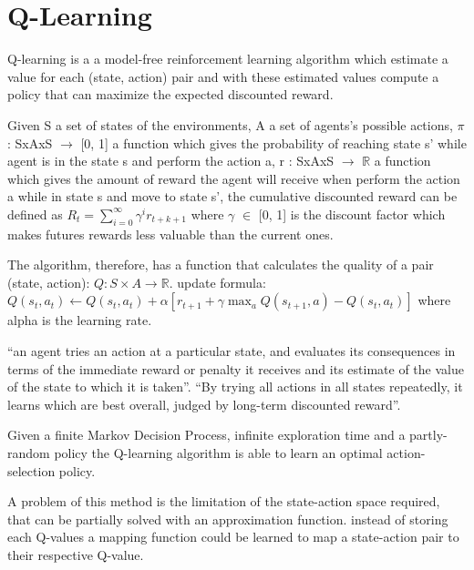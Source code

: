 \section{Q-Learning}

Q-learning\cite{watkins1992q} is a a model-free reinforcement learning algorithm which estimate a value for each (state, action) pair
and with these estimated values compute a policy that can maximize the expected discounted reward.

Given S a set of states of the environments, A a set of agents's possible actions,
$\pi$ : SxAxS $\rightarrow$ [0, 1] a function which gives the probability of reaching state s' while agent is in the state s and perform the action a,
r : SxAxS $\rightarrow$ $\mathbb{R}$ a function which gives the amount of reward the agent will receive when perform the action a while in state s and move to state s',
the cumulative discounted reward can be defined as $R_t = \sum_{i=0}^{\infty} \gamma^i r_{t+k+1}$
where $\gamma$ $\in$ [0, 1] is the discount factor which makes futures rewards less valuable than the current ones.

The algorithm, therefore, has a function that calculates the quality of a pair (state, action): $Q:S\times A\to {\mathbb  {R}}.$
update formula: $Q(s_t, a_t) \leftarrow Q(s_t, a_t) + \alpha [r_{t+1} + \gamma \max_a Q(s_{t+1}, a) - Q(s_t, a_t)]$ where alpha is the learning rate.

``an agent tries an action at a particular state, and evaluates its consequences in terms of the immediate reward or penalty
it receives and its estimate of the value of the state to which it is taken''\cite{watkins1992q}.
``By trying all actions in all states repeatedly, it learns which are best overall, judged by long-term discounted reward''\cite{watkins1992q}.

Given a finite Markov Decision Process, infinite exploration time and a partly-random policy
the Q-learning algorithm is able to learn an optimal action-selection policy.

A problem of this method is the limitation of the state-action space required, that can be partially solved with an approximation function.
instead of storing each Q-values a mapping function could be learned to map a state-action pair to their respective Q-value.
